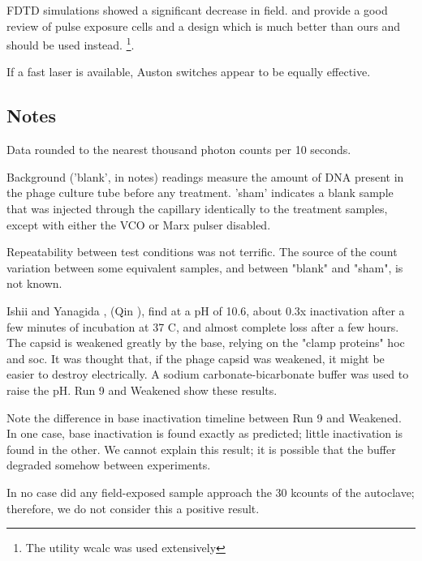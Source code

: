 \documentclass[paper.tex]{subfiles}
\begin{document}
\begin{multicols}{1}
 FDTD simulations showed a significant decrease in field. \cite{Microchamber2011} and \cite{Characterization2012} provide a good review of pulse exposure cells and a design which is much better than ours and should be used instead. \cite{Electromagnetic1989} \footnote{The utility wcalc was used extensively}.

If a fast laser is available, Auston switches appear to be equally effective.



\subsection{Notes}

%



Data rounded to the nearest thousand photon counts per 10 seconds. %

Background ('blank', in notes) readings measure the amount of DNA present in the phage culture tube before any treatment. 'sham' indicates a blank sample that was injected through the capillary identically to the treatment samples, except with either the VCO or Marx pulser disabled.

Repeatability between test conditions was not terrific. The source of the  count variation between some equivalent samples, and between "blank" and "sham", is not known.

Ishii and Yanagida \cite{two1977}, (Qin \cite{Structure2010}), find at a pH of 10.6, about 0.3x inactivation after a few minutes of incubation at 37 C, and almost complete loss after a few hours. The capsid is weakened greatly by the base, relying on the "clamp proteins" hoc and soc. It was thought that, if the phage capsid was weakened, it might be easier to destroy electrically. A sodium carbonate-bicarbonate buffer was used to raise the pH. Run 9 and Weakened show these results. 

Note the difference in base inactivation timeline between Run 9 and Weakened. In one case, base inactivation is found exactly as predicted; little inactivation is found in the other. We cannot explain this result; it is possible that the buffer degraded somehow between experiments.

In no case did any field-exposed sample approach the 30 kcounts of the autoclave; therefore, we do not consider this a positive result.


\end{multicols}
\end{document}
